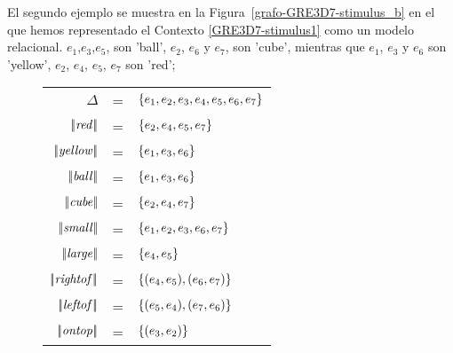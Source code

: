 




El segundo ejemplo se muestra en la Figura~\ref{grafo-GRE3D7-stimulus_b} en el que hemos representado el Contexto \ref{GRE3D7-stimulus1} 
como un modelo relacional. $e_1$,$e_3$,$e_5$, son 'ball', $e_2$, $e_6$ y $e_7$, son 'cube', mientras que 
$e_1$, $e_3$ y $e_6$ son 'yellow', $e_2$, $e_4$, $e_5$, $e_7$ son 'red';

\begin{figure}
\begin{flushleft}
\begin{tabular}{rcl}
$\Delta$              & = & $\{e_1,e_2,e_3,e_4,e_5,e_6,e_7\}$\\
$|\!|\mathit{red}|\!|$      & = & $\{e_2,e_4,e_5,e_7\}$\\
$|\!|\mathit{yellow}|\!|$   & = & $\{e_1,e_3,e_6\}$\\
$|\!|\mathit{ball}|\!|$     & = & $\{e_1,e_3,e_6\}$\\
$|\!|\mathit{cube}|\!|$     & = & $\{e_2,e_4,e_7\}$\\

$|\!|\mathit{small}|\!|$    & = & $\{e_1,e_2,e_3,e_6,e_7\}$\\
$|\!|\mathit{large}|\!|$    & = & $\{e_4,e_5\}$\\

$|\!|\mathit{rightof}|\!|$   & = & $\{(e_4,e_5),(e_6,e_7)\}$\\
$|\!|\mathit{leftof}|\!|$    & = & $\{(e_5,e_4),(e_7,e_6)\}$\\
$|\!|\mathit{ontop}|\!|$     & = & $\{(e_3,e_2)\}$\\


\end{tabular}
\end{flushleft}
\end{figure}
